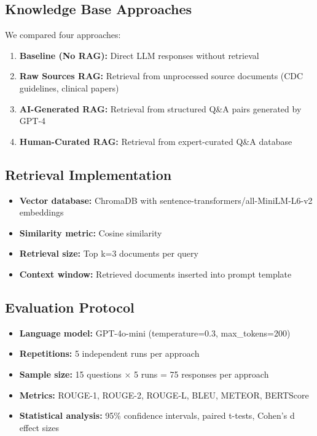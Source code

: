 \documentclass[10pt,letterpaper]{article}
\begin{document}
\subsection*{Knowledge Base Approaches}
We compared four approaches:
\begin{enumerate}
    \item \textbf{Baseline (No RAG):} Direct LLM responses without retrieval
    \item \textbf{Raw Sources RAG:} Retrieval from unprocessed source documents (CDC guidelines, clinical papers)
    \item \textbf{AI-Generated RAG:} Retrieval from structured Q\&A pairs generated by GPT-4
    \item \textbf{Human-Curated RAG:} Retrieval from expert-curated Q\&A database
\end{enumerate}

\subsection*{Retrieval Implementation}
\begin{itemize}
    \item \textbf{Vector database:} ChromaDB with sentence-transformers/all-MiniLM-L6-v2 embeddings
    \item \textbf{Similarity metric:} Cosine similarity
    \item \textbf{Retrieval size:} Top k=3 documents per query
    \item \textbf{Context window:} Retrieved documents inserted into prompt template
\end{itemize}

\subsection*{Evaluation Protocol}
\begin{itemize}
    \item \textbf{Language model:} GPT-4o-mini (temperature=0.3, max\_tokens=200)
    \item \textbf{Repetitions:} 5 independent runs per approach
    \item \textbf{Sample size:} 15 questions × 5 runs = 75 responses per approach
    \item \textbf{Metrics:} ROUGE-1, ROUGE-2, ROUGE-L, BLEU, METEOR, BERTScore
    \item \textbf{Statistical analysis:} 95\% confidence intervals, paired t-tests, Cohen's d effect sizes
\end{itemize}
\end{document}
